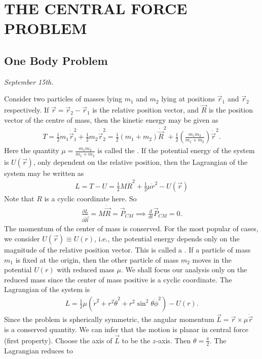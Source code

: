 \chapter{THE CENTRAL FORCE PROBLEM}

\section{One Body Problem}
\textit{September 15th.}

Consider two particles of masses lying $m_{1}$ and $m_{2}$ lying at positions $\vec{r}_{1}$ and $\vec{r}_{2}$ respectively. If $\vec{r} = \vec{r}_{2}-\vec{r}_{1}$ is the relative position vector, and $\vec{R}$ is the position vector of the centre of mass, then the kinetic energy may be given as
\begin{align}
    T = \frac{1}{2}m_{1}\dot{\vec{r}}_{1}^{2} + \frac{1}{2}m_{2}\dot{\vec{r}}_{2}^{2} = \frac{1}{2}(m_{1}+m_{2})\dot{\vec{R}}^{2} + \frac{1}{2}\left( \frac{m_{1}m_{2}}{m_{1}+m_{2}} \right) \dot{\vec{r}}^{2}.
\end{align}
Here the quantity $\mu = \frac{m_{1}m_{2}}{m_{1}+m_{2}}$ is called the . If the potential energy of the system is $U(\vec{r})$, only dependent on the relative position, then the Lagrangian of the system may be written as
\begin{align}
    L = T-U = \frac{1}{2}M\dot{R}^{2} + \frac{1}{2}\mu \dot{r}^{2} - U(\vec{r})
\end{align}
Note that $R$ is a cyclic coordinate here. So
\begin{align}
    \frac{\partial L}{\partial \dot{\vec{R}}} = M\dot{\vec{R}} = \vec{P}_{CM} \implies \frac{d}{dt} \vec{P}_{CM} = 0.
\end{align}
The momentum of the center of mass is conserved. For the most popular of cases, we consider $U(\vec{r}) \equiv U(r)$, i.e., the potential energy depends only on the magnitude of the relative position vector. This is called a . If a particle of mass $m_{1}$ is fixed at the origin, then the other particle of mass $m_{2}$ moves in the potential $U(r)$ with reduced mass $\mu$. We shall focus our analysis only on the reduced mass since the center of mass positive is a cyclic coordinate. The Lagrangian of the system is
\begin{align}
    L = \frac{1}{2}\mu(\dot{r}^{2} + r^{2}\dot{\theta}^{2} + r^{2}\sin^{2}\theta \dot{\phi}^{2}) - U(r).
\end{align}
Since the problem is spherically symmetric, the angular momentum $\vec{L} = \vec{r} \times \mu \dot{\vec{r}}$ is a conserved quantity. We can infer that the motion is planar in central force (first property). Choose the axis of $\vec{L}$ to be the $z$-axis. Then $\theta = \frac{\pi}{2}$. The Lagrangian reduces to
